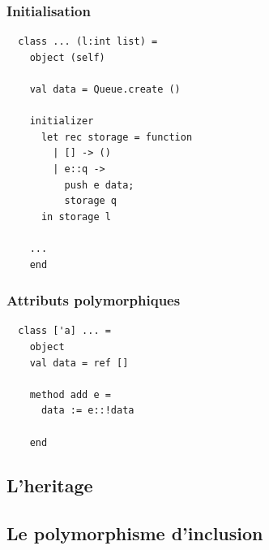 \begin{frame}[fragile]
	\frametitle{Initialisation}
	\begin{lstlisting}
  class ... (l:int list) =
    object (self)
    
    val data = Queue.create ()

    initializer
      let rec storage = function
        | [] -> ()
        | e::q -> 
          push e data;
          storage q
      in storage l
    
    ...
    end
	\end{lstlisting}
\end{frame}

\begin{frame}[fragile]
	\frametitle{Attributs polymorphiques}
	\begin{lstlisting}
  class ['a] ... =
    object 
    val data = ref []

    method add e =
      data := e::!data

    end
	\end{lstlisting}
\end{frame}

\subsection{L'heritage} %
\begin{frame}

\end{frame}

\subsection{Le polymorphisme d'inclusion} %
\begin{frame}

\end{frame}
